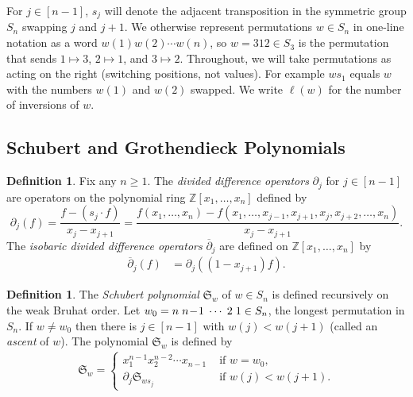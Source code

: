 \documentclass{amsart}
\theoremstyle{definition}
\newtheorem{definition}[theorem]{Definition}
\theoremstyle{named}
\begin{document}
	For $j\in [n-1]$, $s_j$ will denote the adjacent transposition in the symmetric group $S_n$ swapping $j$ and $j+1$. We otherwise represent permutations $w\in S_n$ in one-line notation as a word $w(1)w(2)\cdots w(n)$, so $w=312\in S_3$ is the permutation that sends $1\mapsto 3$, $2\mapsto 1$, and $3\mapsto 2$. Throughout, we will take permutations as acting on the right (switching positions, not values). For example $ws_1$ equals $w$ with the numbers $w(1)$ and $w(2)$ swapped. We write $\ell(w)$ for the number of inversions of $w$.
	
	\subsection{Schubert and Grothendieck Polynomials}
	
	\begin{definition}
		Fix any $n\geq 1$. The \emph{divided difference operators} $\partial_j$ for $j\in[n-1]$ are operators on the polynomial ring $\mathbb{Z}[x_1,\ldots,x_n]$ defined by
		\[\partial_j(f)=\frac{f-(s_j\cdot f)}{x_j-x_{j+1}}
		=\frac{f(x_1,\ldots,x_n)-f(x_1,\ldots,x_{j-1},x_{j+1},x_j,x_{j+2},\ldots,x_n)}{x_j-x_{j+1}}.\]
		The \emph{isobaric divided difference operators} $\overline{\partial}_j$ are defined on $\mathbb{Z}[x_1,\ldots,x_n]$ by
		\begin{align*}
		\overline{\partial}_j(f)&=\partial_j((1-x_{j+1})f).
		\end{align*}
	\end{definition}
	
	\begin{definition}
		The \emph{Schubert polynomial} $\mathfrak{S}_w$ of $w\in S_n$ is defined recursively on the weak Bruhat order. Let $w_0=n \hspace{.1cm} n\!-\!1 \hspace{.1cm} \cdots \hspace{.1cm} 2 \hspace{.1cm} 1 \in S_n$, the longest permutation in $S_n$. If $w\neq w_0$ then there is $j\in [n-1]$ with $w(j)<w(j+1)$ (called an \emph{ascent} of $w$). The polynomial $\mathfrak{S}_w$ is defined by
		\begin{align*}
		\mathfrak{S}_w=\begin{cases}
		x_1^{n-1}x_2^{n-2}\cdots x_{n-1}&\mbox{ if } w=w_0,\\
		\partial_j \mathfrak{S}_{ws_j} &\mbox{ if } w(j)<w(j+1).
		\end{cases}
		\end{align*}
	\end{definition}
	
\end{document}
